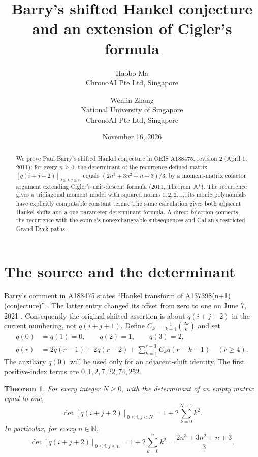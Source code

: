 \documentclass[11pt]{article}
\title{Barry's shifted Hankel conjecture and an extension of Cigler's formula}
\author{Haobo Ma\\\small ChronoAI Pte Ltd, Singapore
\and Wenlin Zhang\\\small National University of Singapore\\\small ChronoAI Pte Ltd, Singapore}
\date{November 16, 2026}
\newtheorem{theorem}{Theorem}
\newcommand{\N}{\mathbb N}
\begin{document}
\maketitle
\begin{abstract}
We prove Paul Barry's shifted Hankel conjecture in OEIS A188475,
revision 2 (April 1, 2011): for every $n\geq0$, the determinant of
the recurrence-defined matrix $[q(i+j+2)]_{0\leq i,j\leq n}$ equals
$(2n^3+3n^2+n+3)/3$, by a moment-matrix cofactor argument extending
Cigler's unit-descent formula (2011, Theorem~A*).
The recurrence gives a tridiagonal moment model with squared norms
$1,2,2,\ldots$; its monic polynomials have explicitly computable constant
terms. The same calculation gives both adjacent Hankel shifts and a
one-parameter determinant formula. A direct bijection connects the
recurrence with the source's nonexchangeable subsequences and Callan's
restricted Grand Dyck paths.
\end{abstract}

\section{The source and the determinant}
Barry's comment in A188475 states ``Hankel transform of A137398(n+1)
(conjecture)'' \cite{barry}. The latter entry changed its offset
from zero to one on June 7, 2021 \cite{source}. Consequently the
original shifted assertion is about $q(i+j+2)$ in the current numbering,
not $q(i+j+1)$. Define $C_k=\frac1{k+1}\binom{2k}{k}$ and set
\begin{equation}\label{rec}
\begin{split}
q(0)&=q(1)=0,\qquad q(2)=1,\qquad q(3)=2,\\
q(r)&=2q(r-1)+2q(r-2)+\sum_{k=1}^{r-3}C_kq(r-k-1)
\quad(r\geq4).
\end{split}
\end{equation}
The auxiliary $q(0)$ will be used only for an adjacent-shift identity.
The first positive-index terms are $0,1,2,7,22,74,252$.

\begin{theorem}\label{main}
For every integer $N\geq0$, with the determinant of an empty matrix
equal to one,
\begin{equation}\label{sizeN}
\det[q(i+j+2)]_{0\leq i,j<N}
 =1+2\sum_{k=0}^{N-1}k^2.
\end{equation}
In particular, for every $n\in\N$,
\begin{equation}\label{cubic}
\det[q(i+j+2)]_{0\leq i,j\leq n}
 =1+2\sum_{k=0}^{n}k^2
 =\frac{2n^3+3n^2+n+3}{3}.
\end{equation}
\end{theorem}
\end{document}
